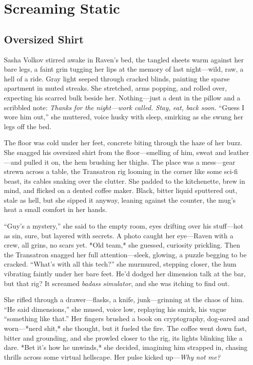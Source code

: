 \documentclass[12pt]{book}
\begin{document}
\chapter{Screaming Static}

\section{Oversized Shirt}

Sasha Volkov stirred awake in Raven’s bed, the tangled sheets warm against her bare legs, a faint grin tugging her lips at the memory of last night—wild, raw, a hell of a ride. Gray light seeped through cracked blinds, painting the sparse apartment in muted streaks. She stretched, arms popping, and rolled over, expecting his scarred bulk beside her. Nothing—just a dent in the pillow and a scribbled note: \textit{Thanks for the night—work called. Stay, eat, back soon.} “Guess I wore him out,” she muttered, voice husky with sleep, smirking as she swung her legs off the bed.

The floor was cold under her feet, concrete biting through the haze of her buzz. She snagged his oversized shirt from the floor—smelling of him, sweat and leather—and pulled it on, the hem brushing her thighs. The place was a mess—gear strewn across a table, the Transatron rig looming in the corner like some sci-fi beast, its cables snaking over the clutter. She padded to the kitchenette, brew in mind, and flicked on a dented coffee maker. Black, bitter liquid sputtered out, stale as hell, but she sipped it anyway, leaning against the counter, the mug’s heat a small comfort in her hands.

“Guy’s a mystery,” she said to the empty room, eyes drifting over his stuff—hot as sin, sure, but layered with secrets. A photo caught her eye—Raven with a crew, all grins, no scars yet. *Old team,* she guessed, curiosity prickling. Then the Transatron snagged her full attention—sleek, glowing, a puzzle begging to be cracked. “What’s with all this tech?” she murmured, stepping closer, the hum vibrating faintly under her bare feet. He’d dodged her dimension talk at the bar, but that rig? It screamed \textit{badass simulator}, and she was itching to find out.

She rifled through a drawer—flasks, a knife, junk—grinning at the chaos of him. “He said dimensions,” she mused, voice low, replaying his smirk, his vague “something like that.” Her fingers brushed a book on cryptography, dog-eared and worn—*nerd shit,* she thought, but it fueled the fire. The coffee went down fast, bitter and grounding, and she prowled closer to the rig, its lights blinking like a dare. *Bet it’s how he unwinds,* she decided, imagining him strapped in, chasing thrills across some virtual hellscape. Her pulse kicked up—\textit{Why not me?}
\end{document}
